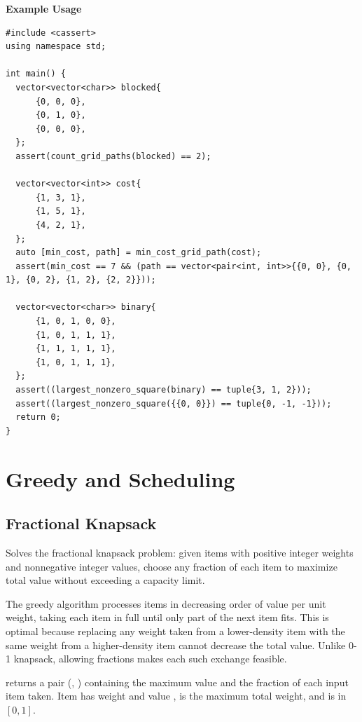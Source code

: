 \textbf{Example Usage}\par
\begin{lstlisting}[style=cpp]
#include <cassert>
using namespace std;

int main() {
  vector<vector<char>> blocked{
      {0, 0, 0},
      {0, 1, 0},
      {0, 0, 0},
  };
  assert(count_grid_paths(blocked) == 2);

  vector<vector<int>> cost{
      {1, 3, 1},
      {1, 5, 1},
      {4, 2, 1},
  };
  auto [min_cost, path] = min_cost_grid_path(cost);
  assert(min_cost == 7 && (path == vector<pair<int, int>>{{0, 0}, {0, 1}, {0, 2}, {1, 2}, {2, 2}}));

  vector<vector<char>> binary{
      {1, 0, 1, 0, 0},
      {1, 0, 1, 1, 1},
      {1, 1, 1, 1, 1},
      {1, 0, 1, 1, 1},
  };
  assert((largest_nonzero_square(binary) == tuple{3, 1, 2}));
  assert((largest_nonzero_square({{0, 0}}) == tuple{0, -1, -1}));
  return 0;
}
\end{lstlisting}

\section{\texorpdfstring{Greedy and Scheduling}{1.5 Greedy and Scheduling}}
\setcounter{section}{5}
\setcounter{subsection}{0}
\subsection{Fractional Knapsack}
\label{sec:1.5.1}
Solves the fractional knapsack problem: given items with positive integer weights and nonnegative integer values, choose any fraction of each item to maximize total value without exceeding a capacity limit.

The greedy algorithm processes items in decreasing order of value per unit weight, taking each item in full until only part of the next item fits. This is optimal because replacing any weight taken from a lower-density item with the same weight from a higher-density item cannot decrease the total value. Unlike 0-1 knapsack, allowing fractions makes each such exchange feasible.

\begin{compactitem}
  \item {} returns a pair (, ) containing the maximum value and the fraction of each input item taken. Item  has weight  and value ,  is the maximum total weight, and  is in $[0, 1]$.
\end{compactitem}

